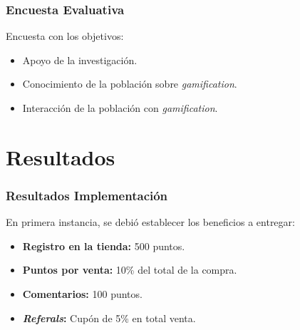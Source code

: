 \documentclass[10pt, compress]{beamer}
\begin{document}
\begin{frame}
 \frametitle{Encuesta Evaluativa}

Encuesta con los objetivos:

\begin{itemize}
 \item Apoyo de la investigación.
 \item Conocimiento de la población sobre \emph{gamification}.
 \item Interacción de la población con \emph{gamification}.
\end{itemize}
\end{frame}

\section{Resultados}

\begin{frame}
 \frametitle{Resultados Implementación}

En primera instancia, se debió establecer los beneficios a entregar:

\begin{itemize}
\item \textbf{Registro en la tienda:} 500 puntos.
\item \textbf{Puntos por venta:} 10\% del total de la compra.
\item \textbf{Comentarios:} 100 puntos.
\item \textbf{\emph{Referals}:} Cupón de 5\% en total venta.
\end{itemize}
\end{frame}
\end{document}
